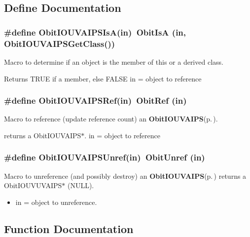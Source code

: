 \subsection{Define Documentation}
\subsubsection{\setlength{\rightskip}{0pt plus 5cm}\#define Obit\-IOUVAIPSIs\-A(in)\ Obit\-Is\-A (in, Obit\-IOUVAIPSGet\-Class())}\label{ObitIOUVAIPS_8h_a2}


Macro to determine if an object is the member of this or a derived class. 

Returns TRUE if a member, else FALSE in = object to reference 
\subsubsection{\setlength{\rightskip}{0pt plus 5cm}\#define Obit\-IOUVAIPSRef(in)\ Obit\-Ref (in)}\label{ObitIOUVAIPS_8h_a1}


Macro to reference (update reference count) an {\bf Obit\-IOUVAIPS}{\rm (p.\,\pageref{structObitIOUVAIPS})}. 

returns a Obit\-IOUVAIPS$\ast$. in = object to reference 
\subsubsection{\setlength{\rightskip}{0pt plus 5cm}\#define Obit\-IOUVAIPSUnref(in)\ Obit\-Unref (in)}\label{ObitIOUVAIPS_8h_a0}


Macro to unreference (and possibly destroy) an {\bf Obit\-IOUVAIPS}{\rm (p.\,\pageref{structObitIOUVAIPS})} returns a Obit\-IOUVUVAIPS$\ast$ (NULL). 

\begin{itemize}
\item in = object to unreference. \end{itemize}


\subsection{Function Documentation}
